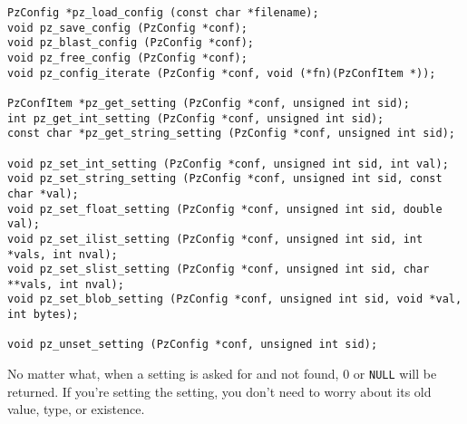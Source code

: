\documentclass[12pt,letterpaper]{report}
\begin{document}
{\footnotesize\begin{verbatim}
PzConfig *pz_load_config (const char *filename);
void pz_save_config (PzConfig *conf);
void pz_blast_config (PzConfig *conf);
void pz_free_config (PzConfig *conf);
void pz_config_iterate (PzConfig *conf, void (*fn)(PzConfItem *));

PzConfItem *pz_get_setting (PzConfig *conf, unsigned int sid);
int pz_get_int_setting (PzConfig *conf, unsigned int sid);
const char *pz_get_string_setting (PzConfig *conf, unsigned int sid);

void pz_set_int_setting (PzConfig *conf, unsigned int sid, int val);
void pz_set_string_setting (PzConfig *conf, unsigned int sid, const char *val);
void pz_set_float_setting (PzConfig *conf, unsigned int sid, double val);
void pz_set_ilist_setting (PzConfig *conf, unsigned int sid, int *vals, int nval);
void pz_set_slist_setting (PzConfig *conf, unsigned int sid, char **vals, int nval);
void pz_set_blob_setting (PzConfig *conf, unsigned int sid, void *val, int bytes);

void pz_unset_setting (PzConfig *conf, unsigned int sid);
\end{verbatim}
}

No matter what, when a setting is asked for and not found, 0 or \verb|NULL| will be returned.
If you're setting the setting, you don't need to worry about its old value, type, or existence.
\end{document}
